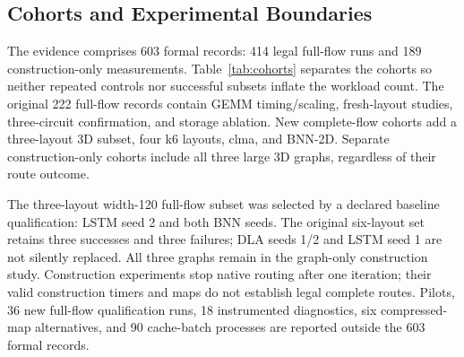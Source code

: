 \documentclass[conference,10pt,letterpaper]{IEEEtran}
\begin{document}
\subsection{Cohorts and Experimental Boundaries}
The evidence comprises 603 formal records: 414 legal full-flow runs and 189 construction-only measurements. Table~\ref{tab:cohorts} separates the cohorts so neither repeated controls nor successful subsets inflate the workload count. The original 222 full-flow records contain GEMM timing/scaling, fresh-layout studies, three-circuit confirmation, and storage ablation. New complete-flow cohorts add a three-layout 3D subset, four k6 layouts, clma, and BNN-2D. Separate construction-only cohorts include all three large 3D graphs, regardless of their route outcome.

The three-layout width-120 full-flow subset was selected by a declared baseline qualification: LSTM seed 2 and both BNN seeds. The original six-layout set retains three successes and three failures; DLA seeds 1/2 and LSTM seed 1 are not silently replaced. All three graphs remain in the graph-only construction study. Construction experiments stop native routing after one iteration; their valid construction timers and maps do not establish legal complete routes. Pilots, 36 new full-flow qualification runs, 18 instrumented diagnostics, six compressed-map alternatives, and 90 cache-batch processes are reported outside the 603 formal records.
\end{document}
